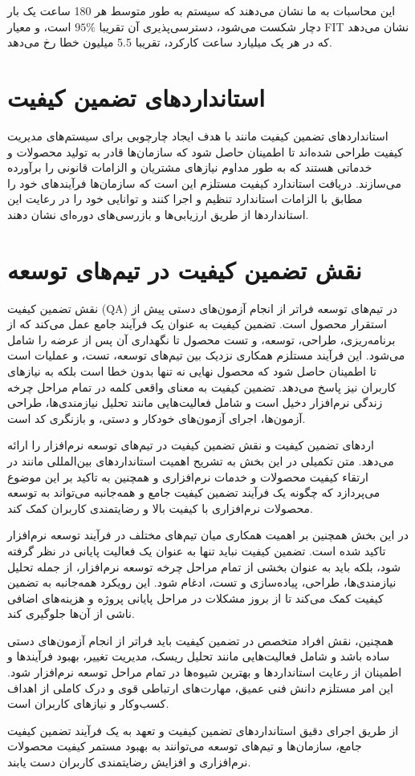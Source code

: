 این محاسبات به ما نشان می‌دهند که سیستم به طور متوسط هر 180 ساعت یک بار دچار شکست می‌شود، دسترسی‌پذیری آن تقریبا
 $95\%$
 است، و معیار FIT نشان می‌دهد که در هر یک میلیارد ساعت کارکرد، تقریبا 5.5 میلیون خطا رخ می‌دهد.

\section*{استانداردهای تضمین کیفیت}

استانداردهای تضمین کیفیت مانند  با هدف ایجاد چارچوبی برای سیستم‌های مدیریت کیفیت طراحی شده‌اند تا اطمینان حاصل شود که سازمان‌ها قادر به تولید محصولات و خدماتی هستند که به طور مداوم نیازهای مشتریان و الزامات قانونی را برآورده می‌سازند. دریافت استاندارد کیفیت  مستلزم این است که سازمان‌ها فرآیندهای خود را مطابق با الزامات استاندارد تنظیم و اجرا کنند و توانایی خود را در رعایت این استانداردها از طریق ارزیابی‌ها و بازرسی‌های دوره‌ای نشان دهند.

\section*{نقش تضمین کیفیت در تیم‌های توسعه}

نقش تضمین کیفیت (QA) در تیم‌های توسعه فراتر از انجام آزمون‌های دستی پیش از استقرار محصول است. تضمین کیفیت به عنوان یک فرآیند جامع عمل می‌کند که از برنامه‌ریزی، طراحی، توسعه، و تست محصول تا نگهداری آن پس از عرضه را شامل می‌شود. این فرآیند مستلزم همکاری نزدیک بین تیم‌های توسعه، تست، و عملیات است تا اطمینان حاصل شود که محصول نهایی نه تنها بدون خطا است بلکه به نیازهای کاربران نیز پاسخ می‌دهد. تضمین کیفیت به معنای واقعی کلمه در تمام مراحل چرخه زندگی نرم‌افزار دخیل است و شامل فعالیت‌هایی مانند تحلیل نیازمندی‌ها، طراحی آزمون‌ها، اجرای آزمون‌های خودکار و دستی، و بازنگری کد است.

اردهای تضمین کیفیت و نقش تضمین کیفیت در تیم‌های توسعه نرم‌افزار را ارائه می‌دهد. متن تکمیلی در این بخش به تشریح اهمیت استانداردهای بین‌المللی مانند  در ارتقاء کیفیت محصولات و خدمات نرم‌افزاری و همچنین به تاکید بر این موضوع می‌پردازد که چگونه یک فرآیند تضمین کیفیت جامع و همه‌جانبه می‌تواند به توسعه محصولات نرم‌افزاری با کیفیت بالا و رضایتمندی کاربران کمک کند.

در این بخش همچنین بر اهمیت همکاری میان تیم‌های مختلف در فرآیند توسعه نرم‌افزار تاکید شده است. تضمین کیفیت نباید تنها به عنوان یک فعالیت پایانی در نظر گرفته شود، بلکه باید به عنوان بخشی از تمام مراحل چرخه توسعه نرم‌افزار، از جمله تحلیل نیازمندی‌ها، طراحی، پیاده‌سازی و تست، ادغام شود. این رویکرد همه‌جانبه به تضمین کیفیت کمک می‌کند تا از بروز مشکلات در مراحل پایانی پروژه و هزینه‌های اضافی ناشی از آن‌ها جلوگیری کند.

همچنین، نقش افراد متخصص در تضمین کیفیت باید فراتر از انجام آزمون‌های دستی ساده باشد و شامل فعالیت‌هایی مانند تحلیل ریسک، مدیریت تغییر، بهبود فرآیندها و اطمینان از رعایت استانداردها و بهترین شیوه‌ها در تمام مراحل توسعه نرم‌افزار شود. این امر مستلزم دانش فنی عمیق، مهارت‌های ارتباطی قوی و درک کاملی از اهداف کسب‌وکار و نیازهای کاربران است.

از طریق اجرای دقیق استانداردهای تضمین کیفیت و تعهد به یک فرآیند تضمین کیفیت جامع، سازمان‌ها و تیم‌های توسعه می‌توانند به بهبود مستمر کیفیت محصولات نرم‌افزاری و افزایش رضایتمندی کاربران دست یابند.